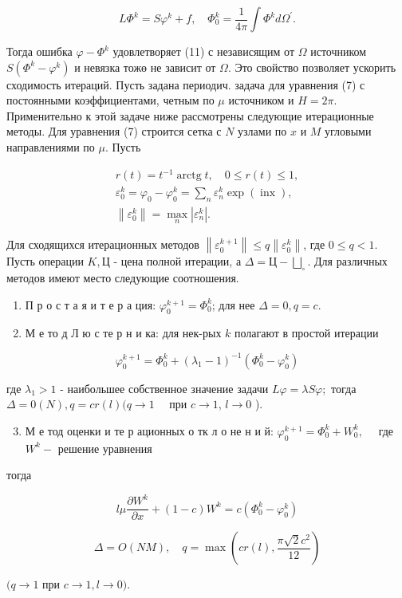 \documentclass[10pt]{article}
\begin{document}
\[
L \Phi^{k}=S \varphi^{k}+f, \quad \Phi_{0}^{k}=\frac{1}{4 \pi} \int \Phi^{k} d \Omega^{\prime} .
\]

Тогда ошибка $\varphi-\Phi^{k}$ удовлетворяет (11) с независящим от $\Omega$ источником $S\left(\Phi^{k}-\varphi^{k}\right)$ и невязка тожө не зависит от $\Omega$. Это свойство позволяет ускорить сходимость итераций. Пусть задана периодич. задача для уравнения (7) с постоянными коэффициентами, четным по $\mu$ источником и $H=2 \pi$. Применительно к этой задаче ниже рассмотрены следующие итерационные методы. Для уравнения (7) строится сетка с $N$ узлами по $x$ и $M$ угловыми направлениями по $\mu$. Пусть

\[
\begin{gathered}
r(t)=t^{-1} \operatorname{arctg} t, \quad 0 \leqslant r(t) \leqslant 1, \\
\varepsilon_{0}^{k}=\varphi_{0}-\varphi_{0}^{k}=\sum_{n} \varepsilon_{n}^{k} \exp (\operatorname{inx}), \\
\left\|\varepsilon_{0}^{k}\right\|=\max _{n}\left|\varepsilon_{n}^{k}\right| .
\end{gathered}
\]

Для сходящихся итерационных методов $\left\|\varepsilon_{0}^{k+1}\right\| \leqslant q\left\|\varepsilon_{0}^{k}\right\|$, где $0 \leqslant q<1$. Пусть операции $K, Ц$ - цена полной итерации, а $\Delta=Ц-\bigsqcup_{\circ}$. Для различных методов имеют место следующие соотношения.

\begin{enumerate}
  \item П р о с т а я и т е р а ция: $\varphi_{0}^{k+1}=\Phi_{0}^{k}$; для нее $\Delta=0, q=c$.

  \item М е то д Л ю с те р н и ка: для нек-рых $k$ полагают в простой итерации

\end{enumerate}

\[
\varphi_{0}^{k+1}=\Phi_{0}^{k}+\left(\lambda_{1}-1\right)^{-1}\left(\Phi_{0}^{k}-\varphi_{0}^{k}\right)
\]

где $\lambda_{1}>1$ - наибольшее собственное значение задачи $L \varphi=\lambda S \varphi ;$ тогда $\Delta=0(N), q=c r(l)(q \rightarrow 1 \quad$ при $c \rightarrow 1$, $l \rightarrow 0$ ).

\begin{enumerate}
  \setcounter{enumi}{2}
  \item М е тод оценки и те р ационных о тк л о не н и й: $\varphi_{0}^{k+1}=\Phi_{0}^{k}+W_{0}^{k}, \quad$ где $W^{k}-$ решение уравнения
\end{enumerate}

тогда

\[
l \mu \frac{\partial W^{k}}{\partial x}+(1-c) W^{k}=c\left(\Phi_{0}^{k}-\varphi_{0}^{k}\right)
\]

\[
\Delta=O(N M), \quad q=\max \left(c r(l), \frac{\pi \sqrt{2} c^{2}}{12}\right)
\]

$(q \rightarrow 1$ при $c \rightarrow 1, l \rightarrow 0)$.
\end{document}
